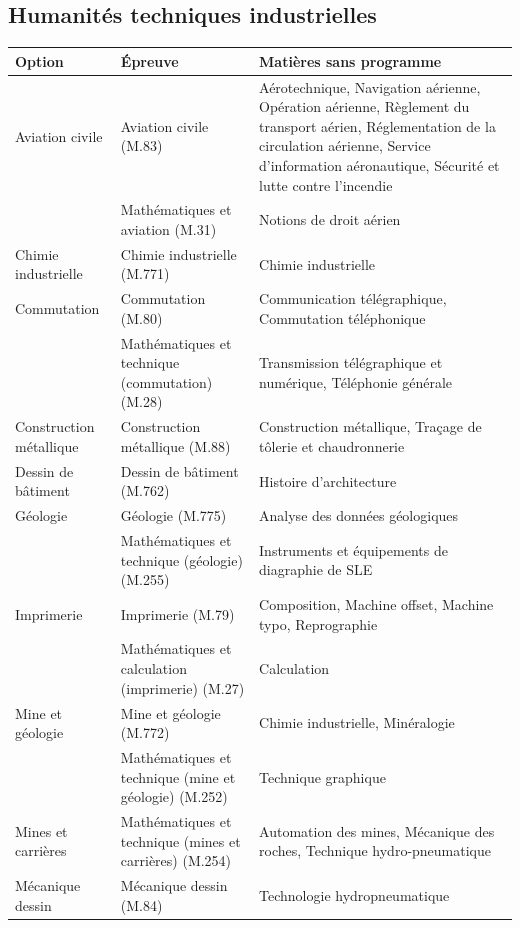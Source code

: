 \documentclass[11pt,a4paper]{article}
\begin{document}
\subsection{Humanités techniques industrielles}
\begin{longtable}{@{}>{\raggedright\arraybackslash}p{3.4cm}>{\raggedright\arraybackslash}p{4.4cm}>{\raggedright\arraybackslash}p{7.4cm}@{}}
\toprule
\textbf{Option} & \textbf{Épreuve} & \textbf{Matières sans programme}\\
\midrule\endhead
Aviation civile & Aviation civile (M.83) & Aérotechnique, Navigation aérienne, Opération aérienne, Règlement du transport aérien, Réglementation de la circulation aérienne, Service d'information aéronautique, Sécurité et lutte contre l'incendie\\
 & Mathématiques et aviation (M.31) & Notions de droit aérien\\
Chimie industrielle & Chimie industrielle (M.771) & Chimie industrielle\\
Commutation & Commutation (M.80) & Communication télégraphique, Commutation téléphonique\\
 & Mathématiques et technique (commutation) (M.28) & Transmission télégraphique et numérique, Téléphonie générale\\
Construction métallique & Construction métallique (M.88) & Construction métallique, Traçage de tôlerie et chaudronnerie\\
Dessin de bâtiment & Dessin de bâtiment (M.762) & Histoire d'architecture\\
Géologie & Géologie (M.775) & Analyse des données géologiques\\
 & Mathématiques et technique (géologie) (M.255) & Instruments et équipements de diagraphie de SLE\\
Imprimerie & Imprimerie (M.79) & Composition, Machine offset, Machine typo, Reprographie\\
 & Mathématiques et calculation (imprimerie) (M.27) & Calculation\\
Mine et géologie & Mine et géologie (M.772) & Chimie industrielle, Minéralogie\\
 & Mathématiques et technique (mine et géologie) (M.252) & Technique graphique\\
Mines et carrières & Mathématiques et technique (mines et carrières) (M.254) & Automation des mines, Mécanique des roches, Technique hydro-pneumatique\\
Mécanique dessin & Mécanique dessin (M.84) & Technologie hydropneumatique\\

\end{longtable}
\end{document}
